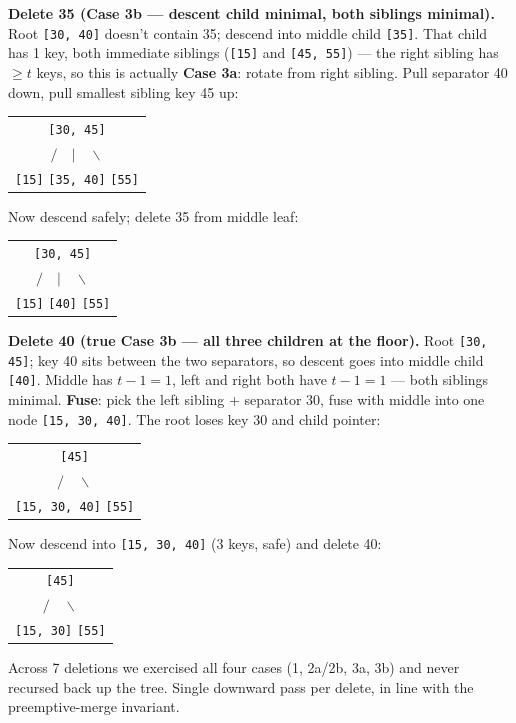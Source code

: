\documentclass[11pt]{article}
\begin{document}
\begin{examplebox}
\textbf{Delete 35 (Case 3b --- descent child minimal, both siblings
minimal).} Root \texttt{[30, 40]} doesn't contain 35; descend into
middle child \texttt{[35]}. That child has 1 key, both immediate
siblings (\texttt{[15]} and \texttt{[45, 55]}) --- the right sibling
has $\ge t$ keys, so this is actually \textbf{Case 3a}: rotate from
right sibling. Pull separator 40 down, pull smallest sibling key 45
up:
\begin{center}\begin{tabular}{c}
    \texttt{[30, 45]} \\
    $/ \quad | \quad \backslash$ \\
    \texttt{[15]} \quad \texttt{[35, 40]} \quad \texttt{[55]}
\end{tabular}\end{center}
Now descend safely; delete 35 from middle leaf:
\begin{center}\begin{tabular}{c}
    \texttt{[30, 45]} \\
    $/ \quad | \quad \backslash$ \\
    \texttt{[15]} \quad \texttt{[40]} \quad \texttt{[55]}
\end{tabular}\end{center}

\textbf{Delete 40 (true Case 3b --- all three children at the
floor).} Root \texttt{[30, 45]}; key 40 sits between the two
separators, so descent goes into middle child \texttt{[40]}.
Middle has $t - 1 = 1$, left and right both have $t - 1 = 1$ ---
both siblings minimal. \textbf{Fuse}: pick the left sibling +
separator 30, fuse with middle into one node \texttt{[15, 30, 40]}.
The root loses key 30 and child pointer:
\begin{center}\begin{tabular}{c}
    \texttt{[45]} \\
    $/ \quad \backslash$ \\
    \texttt{[15, 30, 40]} \quad \texttt{[55]}
\end{tabular}\end{center}
Now descend into \texttt{[15, 30, 40]} (3 keys, safe) and delete 40:
\begin{center}\begin{tabular}{c}
    \texttt{[45]} \\
    $/ \quad \backslash$ \\
    \texttt{[15, 30]} \quad \texttt{[55]}
\end{tabular}\end{center}

Across 7 deletions we exercised all four cases (1, 2a/2b, 3a, 3b)
and never recursed back up the tree. Single downward pass per
delete, in line with the preemptive-merge invariant.
\end{examplebox}
\end{document}
